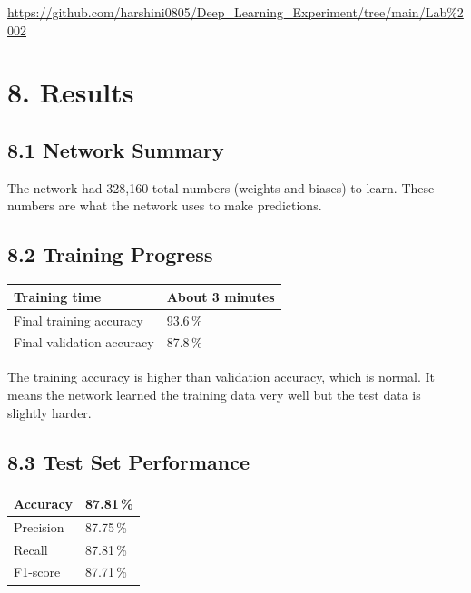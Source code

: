 \documentclass[11pt]{article}
\begin{document}
\begin{center}
\url{https://github.com/harshini0805/Deep_Learning_Experiment/tree/main/Lab\%2002}
\end{center}

\section*{8. Results}

\subsection*{8.1 Network Summary}

The network had 328,160 total numbers (weights and biases) to learn. These numbers are what the network uses to make predictions.

\subsection*{8.2 Training Progress}

\begin{center}
\begin{tabular}{|l|l|}
\hline
Training time & About 3 minutes\\ \hline
Final training accuracy & 93.6\,\%\\ \hline
Final validation accuracy & 87.8\,\%\\ \hline
\end{tabular}
\end{center}

The training accuracy is higher than validation accuracy, which is normal. It means the network learned the training data very well but the test data is slightly harder.

\subsection*{8.3 Test Set Performance}

\begin{center}
\begin{tabular}{|l|l|}
\hline
Accuracy & 87.81\,\%\\ \hline
Precision & 87.75\,\%\\ \hline
Recall & 87.81\,\%\\ \hline
F1-score & 87.71\,\%\\ \hline
\end{tabular}
\end{center}
\end{document}
